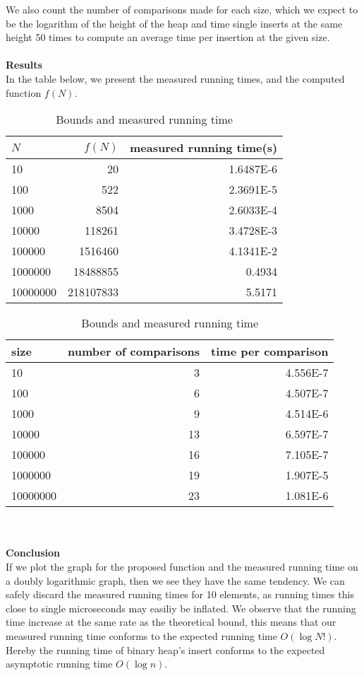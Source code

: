 \documentclass[a4paper,10pt]{article}
\begin{document}
We also count the number of comparisons made for each size, which we expect to be the logarithm of the height of the heap and time single inserts at the same height 50 times to compute an average time per insertion at the given size.\\\\
{\bf Results}\\
In the table below, we present the measured running times, and the computed function $f(N)$.
\begin{table}
  \begin{center}
    \begin{tabular}{l|r|r}
      $N$ & $f(N)$ & measured running time(s) \\
      \hline
      10       & 20         & \num{1.6487E-6}\\
      100      & 522        & \num{2.3691E-5}\\
      1000     & 8504       & \num{2.6033E-4}\\
      10000    & 118261     & \num{3.4728E-3}\\
      100000   & 1516460    & \num{4.1341E-2}\\
      1000000  & 18488855   & \num{0.4934}\\
      10000000 & 218107833  & \num{5.5171}
    \end{tabular}
    \caption{Bounds and measured running time}
  \end{center}
\end{table}
\begin{table}
  \begin{center}
    \begin{tabular}{l|r|r}
      size & number of comparisons & time per comparison\\
      \hline
      10       & 3  & \num{4.556E-7}\\
      100      & 6  & \num{4.507E-7}\\
      1000     & 9  & \num{4.514E-6}\\
      10000    & 13 & \num{6.597E-7}\\
      100000   & 16 & \num{7.105E-7}\\
      1000000  & 19 & \num{1.907E-5}\\
      10000000 & 23 & \num{1.081E-6}
    \end{tabular}
    \caption{Bounds and measured running time}
  \end{center}
\end{table}\\\\
{\bf Conclusion}\\
If we plot the graph for the proposed function and the measured running time on a doubly logarithmic graph, then we see they have the same tendency. We can safely discard the measured running times for 10 elements, as running times this close to single microseconds may easiliy be inflated. We observe that the running time increase at the same rate as the theoretical bound, this means that our measured running time conforms to the expected running time $O(\log N!)$. Hereby the running time of binary heap's insert conforms to the expected asymptotic running time $O(\log n)$.
\end{document}
